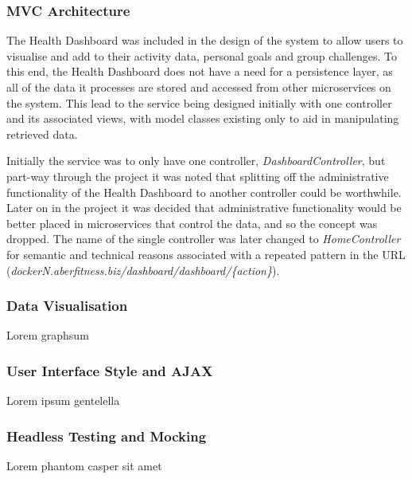 \subsubsection{MVC Architecture}
\par
The Health Dashboard was included in the design of the system to allow users to visualise and add to their activity data, personal goals and group challenges. To this end, the Health Dashboard does not have a need for a persistence layer, as all of the data it processes are stored and accessed from other microservices on the system. This lead to the service being designed initially with one controller and its associated views, with model classes existing only to aid in manipulating retrieved data.

\par
Initially the service was to only have one controller, \textit{DashboardController}, but part-way through the project it was noted that splitting off the administrative functionality of the Health Dashboard to another controller could be worthwhile. Later on in the project it was decided that administrative functionality would be better placed in microservices that control the data, and so the concept was dropped. The name of the single controller was later changed to \textit{HomeController} for semantic and technical reasons associated with a repeated pattern in the URL (\textit{dockerN.aberfitness.biz/dashboard/dashboard/\{action\}}).

\subsubsection{Data Visualisation}
\par
Lorem graphsum

\subsubsection{User Interface Style and AJAX}
\par
Lorem ipsum gentelella

\subsubsection{Headless Testing and Mocking}
\par
Lorem phantom casper sit amet
